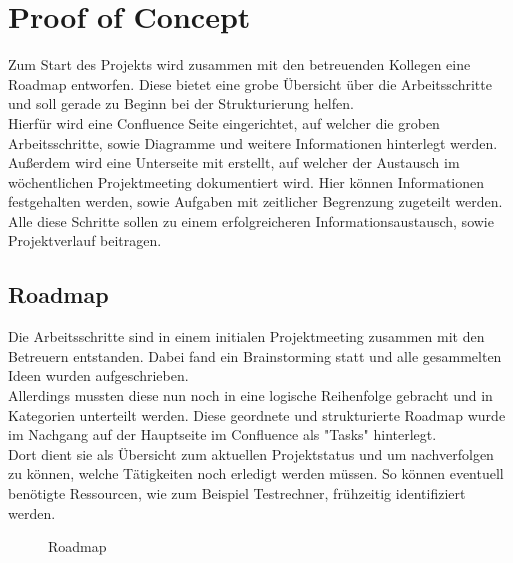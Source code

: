 
\section{Proof of Concept}
\label{section:poc}
Zum Start des Projekts wird zusammen mit den betreuenden Kollegen eine Roadmap entworfen.
Diese bietet eine grobe Übersicht über die Arbeitsschritte und soll gerade zu Beginn bei der Strukturierung helfen.\\

Hierfür wird eine Confluence Seite eingerichtet, auf welcher die groben Arbeitsschritte, sowie Diagramme und weitere Informationen hinterlegt werden.
Außerdem wird eine Unterseite mit erstellt, auf welcher der Austausch im wöchentlichen Projektmeeting dokumentiert wird.
Hier können Informationen festgehalten werden, sowie Aufgaben mit zeitlicher Begrenzung zugeteilt werden.\\

Alle diese Schritte sollen zu einem erfolgreicheren Informationsaustausch, sowie Projektverlauf beitragen.


\subsection{Roadmap}
\label{section:roadmap}

Die Arbeitsschritte sind in einem initialen Projektmeeting zusammen mit den Betreuern entstanden.
Dabei fand ein Brainstorming statt und alle gesammelten Ideen wurden aufgeschrieben.\\

Allerdings mussten diese nun noch in eine logische Reihenfolge gebracht und in Kategorien unterteilt werden.
Diese geordnete und strukturierte Roadmap wurde im Nachgang auf der Hauptseite im Confluence als "Tasks" hinterlegt.\\

Dort dient sie als Übersicht zum aktuellen Projektstatus und um nachverfolgen zu können, welche Tätigkeiten noch erledigt werden müssen.
So können eventuell benötigte Ressourcen, wie zum Beispiel Testrechner, frühzeitig identifiziert werden.\\

\begin{figure}[H]
	\centering	
	\caption{Roadmap}
	\label{fig:roadmap}
\end{figure}

